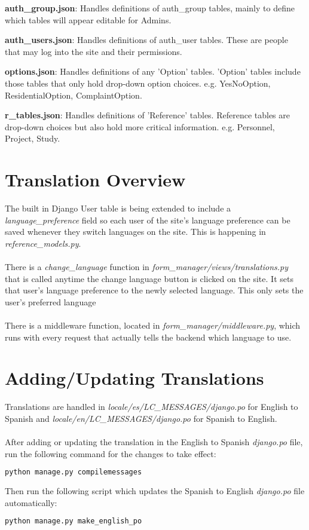 \documentclass{article}
\begin{document}
\textbf{auth\_group.json}: Handles definitions of auth\_group tables, mainly to define which tables will appear editable for Admins.

\textbf{auth\_users.json}: Handles definitions of auth\_user tables. These are people that may log into the site and their permissions.

\textbf{options.json}: Handles definitions of any 'Option' tables.  'Option' tables include those tables that only hold drop-down option choices. e.g. YesNoOption, ResidentialOption, ComplaintOption.

\textbf{r\_tables.json}: Handles definitions of 'Reference' tables.  Reference tables are drop-down choices but also hold more critical information.  e.g. Personnel, Project, Study.

\section{Translation Overview}
The built in Django User table is being extended to include a \textit{language\_preference} field so each user of the site's language preference can be saved whenever they switch languages on the site. This is happening in \textit{reference\_models.py}.
\\\\There is a \textit{change\_language} function in \textit{form\_manager/views/translations.py} that is called anytime the change language button is clicked on the site.  It sets that user's language preference to the newly selected language.  This only sets the user's preferred language
\\\\There is a middleware function, located in \textit{form\_manager/middleware.py}, which runs with every request that actually tells the backend which language to use.

\section{Adding/Updating Translations}
Translations are handled in \textit{locale/es/LC\_MESSAGES/django.po} for English to Spanish and \textit{locale/en/LC\_MESSAGES/django.po} for Spanish to English. 
\\\\After adding or updating the translation in the English to Spanish \textit{django.po} file, run the following command for the changes to take effect:
\begin{lstlisting}[language=bash]
  python manage.py compilemessages
\end{lstlisting}
Then run the following script which updates the Spanish to English \textit{django.po} file automatically:
\begin{lstlisting}[language=bash]
  python manage.py make_english_po
\end{lstlisting}
\end{document}
